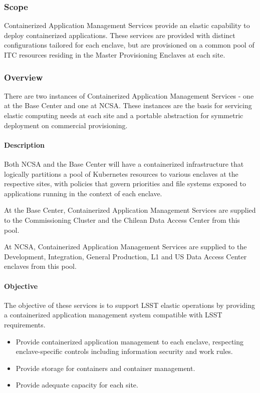 ﻿\subsubsection{Scope}

Containerized Application Management Services provide an elastic capability to deploy containerized
applications. These services are provided with distinct configurations tailored for each enclave, 
but are provisioned on a common pool of ITC resources residing in the Master Provisioning Enclaves at each site. 

\subsubsection{Overview}

There are two instances of Containerized Application Management Services - 
one at the Base Center and one at NCSA. These instances are the basis for servicing
elastic computing needs at each site and a portable abstraction for symmetric
deployment on commercial provisioning.

\paragraph{Description}

Both NCSA and the Base Center will have a containerized infrastructure that
logically partitions a pool of Kubernetes resources to various enclaves at the respective
sites, with policies that govern priorities and file systems exposed to
applications running in the context of each enclave.

At the Base Center, Containerized Application Management Services are supplied to the Commissioning
Cluster and the Chilean Data Access Center from this pool.

At NCSA, Containerized Application Management Services are supplied to the Development, Integration,
General Production, L1 and US Data Access Center enclaves from this pool.

\paragraph{Objective}

The objective of these services is to support LSST elastic operations by providing a containerized application 
management system compatible with LSST requirements. 

\begin{itemize}

\item Provide containerized application management to each enclave, respecting enclave-specific controls including information security and work rules. 

\item Provide storage for containers and container management.

\item Provide adequate capacity for each site.

\end{itemize}

